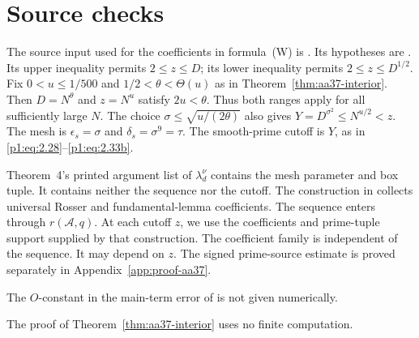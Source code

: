 \section{Source checks}\label{app:finite-source-checks}

The source input used for the coefficients in formula~\textup{(W)}
is \cite[Theorem~4]{AA37}. Its hypotheses are \cite[(1)--(2)]{AA37}.
Its upper inequality permits $2\le z\le D$;
its lower inequality permits $2\le z\le D^{1/2}$.  Fix $0<u\le 1/500$ and $1/2<\theta<\Theta(u)$ as in
Theorem~\ref{thm:aa37-interior}. Then $D=N^\theta$ and $z=N^u$ satisfy
$2u<\theta$.  Thus both ranges apply for all sufficiently large $N$.
The choice $\sigma\le\sqrt{u/(2\theta)}$ also gives
$Y=D^{\sigma^2}\le N^{u/2}<z$.  The mesh is
$\epsilon_s=\sigma$ and $\delta_s=\sigma^9=\tau$. The
smooth-prime cutoff is $Y$, as in
\eqref{p1:eq:2.28}--\eqref{p1:eq:2.33b}.

Theorem~4's printed argument list of $\lambda_d^\nu$ contains the
mesh parameter and box tuple. It contains neither the sequence nor the
cutoff.
The construction in \cite[(23)--(26)]{AA37} collects universal
Rosser and fundamental-lemma coefficients.  The sequence enters through
$r(\mathcal A,q)$.  At each cutoff $z$, we use the coefficients and
prime-tuple support supplied by that construction. The coefficient
family is independent of the sequence. It may depend on $z$.
The signed prime-source estimate is proved
separately in Appendix~\ref{app:proof-aa37}.

The $O$-constant in the main-term error of \cite[Theorem~4]{AA37}
is not given numerically.

The proof of Theorem~\ref{thm:aa37-interior} uses no finite computation.
